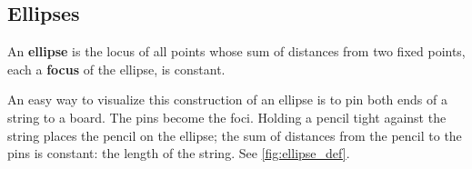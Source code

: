 %
%
%
%	
%

\subsection*{Ellipses}

{An \textbf{ellipse} is the locus of all points whose sum of distances from two fixed points, each a \textbf{focus} of the ellipse, is constant.}

An easy way to visualize this construction of an ellipse is to pin both ends of a string to a board. The pins become the foci. Holding a pencil tight against the string places the pencil on the ellipse; the sum of distances from the pencil to the pins is constant: the length of the string. See \autoref{fig:ellipse_def}.

